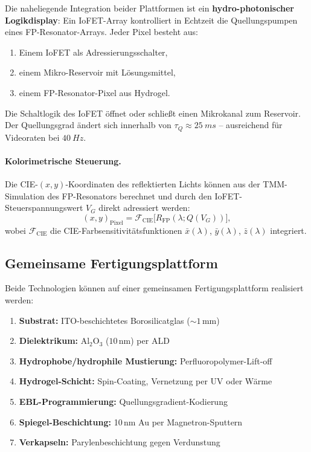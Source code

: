 ﻿\documentclass[a4paper,12pt]{scrreprt}
\theoremstyle{definition}
\begin{document}
Die naheliegende Integration beider Plattformen ist ein \textbf{hydro-photonischer
Logikdisplay}: Ein IoFET-Array kontrolliert in Echtzeit die Quellungspumpen
eines FP-Resonator-Arrays. Jeder Pixel besteht aus:
\begin{enumerate}
  \item Einem IoFET als Adressierungsschalter,
  \item einem Mikro-Reservoir mit Lösungsmittel,
  \item einem FP-Resonator-Pixel aus Hydrogel.
\end{enumerate}

Die Schaltlogik des IoFET öffnet oder schließt einen Mikrokanal zum Reservoir.
Der Quellungsgrad ändert sich innerhalb von $\tau_Q \approx \SI{25}{ms}$ --
ausreichend für Videoraten bei $\SI{40}{Hz}$.

\paragraph{Kolorimetrische Steuerung.}
Die CIE-$(x,y)$-Koordinaten des reflektierten Lichts können aus der
TMM-Simulation des FP-Resonators berechnet und durch den IoFET-Steuerspannungswert
$V_G$ direkt adressiert werden:
\begin{equation}
  (x, y)_\mathrm{Pixel} = \mathcal{F}_{\mathrm{CIE}}\bigl[R_\mathrm{FP}(\lambda; Q(V_G))\bigr],
\end{equation}
wobei $\mathcal{F}_{\mathrm{CIE}}$ die CIE-Farbsensitivitätsfunktionen $\bar{x}(\lambda)$,
$\bar{y}(\lambda)$, $\bar{z}(\lambda)$ integriert.

\subsection{Gemeinsame Fertigungsplattform}

Beide Technologien können auf einer gemeinsamen Fertigungsplattform realisiert werden:

\begin{enumerate}
  \item \textbf{Substrat:} ITO-beschichtetes Borosilicatglas ($\sim 1$\,mm)
  \item \textbf{Dielektrikum:} Al$_2$O$_3$ ($10$\,nm) per ALD
  \item \textbf{Hydrophobe/hydrophile Mustierung:} Perfluoropolymer-Lift-off
  \item \textbf{Hydrogel-Schicht:} Spin-Coating, Vernetzung per UV oder Wärme
  \item \textbf{EBL-Programmierung:} Quellungsgradient-Kodierung
  \item \textbf{Spiegel-Beschichtung:} 10\,nm Au per Magnetron-Sputtern
  \item \textbf{Verkapseln:} Parylenbeschichtung gegen Verdunstung
\end{enumerate}
\end{document}
